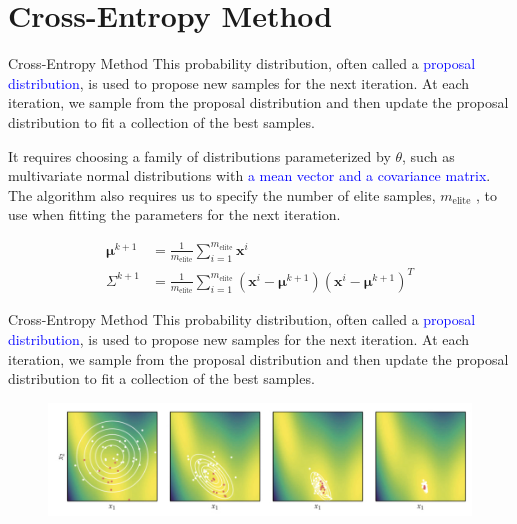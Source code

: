 \documentclass{beamer}
\begin{document}
\section{Cross-Entropy Method}
\begin{frame}{Cross-Entropy Method}
This probability distribution, often called a \textcolor{blue}{proposal distribution}, is used to propose new samples for the next iteration. At each iteration, we sample from the proposal distribution and then update the proposal distribution to fit a collection of the best samples. 

		It requires choosing a family of distributions parameterized by $\theta$, such as multivariate normal distributions with \textcolor{blue}{a mean vector and a covariance matrix}. The algorithm also requires us to specify the number of elite samples, $m_{\textrm{elite}}$ , to use when fitting the parameters for the next iteration.

\begin{equation*}
\begin{split}
    \boldsymbol{\mu}^{k+1} &= \frac{1}{m_{\textrm{elite}}} \sum_{i=1}^{m_{\textrm{elite}}} \boldsymbol{x}^i\\
    \Sigma^{k+1} &= \frac{1}{m_{\textrm{elite}}} \sum_{i=1}^{m_{\textrm{elite}}} (\boldsymbol{x}^i - \boldsymbol{\mu}^{k+1})(\boldsymbol{x}^i - \boldsymbol{\mu}^{k+1})^T
\end{split}
\end{equation*}
\end{frame}

\begin{frame}{Cross-Entropy Method}
This probability distribution, often called a \textcolor{blue}{proposal distribution}, is used to propose new samples for the next iteration. At each iteration, we sample from the proposal distribution and then update the proposal distribution to fit a collection of the best samples. 

\begin{figure}
\centering
\includegraphics[width=120mm]{Figs/Cross-entropy.jpeg}
\end{figure}   
\end{frame}
\end{document}
